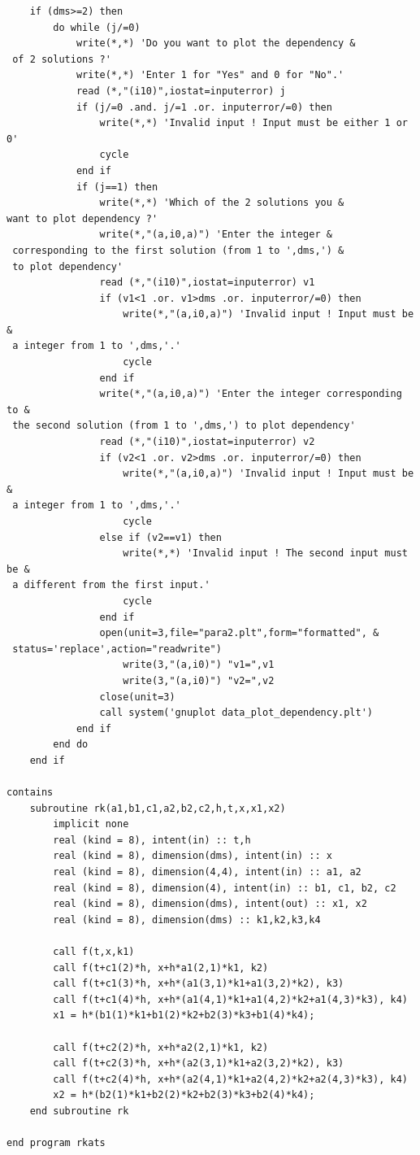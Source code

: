 \documentclass[a4paper,oneside]{book}
\numberwithin{equation}{chapter}
\begin{document}
\begin{lstlisting}
	if (dms>=2) then
		do while (j/=0)
			write(*,*) 'Do you want to plot the dependency &
 of 2 solutions ?'
			write(*,*) 'Enter 1 for "Yes" and 0 for "No".'
			read (*,"(i10)",iostat=inputerror) j
			if (j/=0 .and. j/=1 .or. inputerror/=0) then
				write(*,*) 'Invalid input ! Input must be either 1 or 0'
				cycle
			end if
			if (j==1) then
				write(*,*) 'Which of the 2 solutions you &
want to plot dependency ?'
				write(*,"(a,i0,a)") 'Enter the integer &
 corresponding to the first solution (from 1 to ',dms,') &
 to plot dependency'
				read (*,"(i10)",iostat=inputerror) v1
				if (v1<1 .or. v1>dms .or. inputerror/=0) then
					write(*,"(a,i0,a)") 'Invalid input ! Input must be &
 a integer from 1 to ',dms,'.'
					cycle
				end if
				write(*,"(a,i0,a)") 'Enter the integer corresponding to &
 the second solution (from 1 to ',dms,') to plot dependency'
				read (*,"(i10)",iostat=inputerror) v2
				if (v2<1 .or. v2>dms .or. inputerror/=0) then
					write(*,"(a,i0,a)") 'Invalid input ! Input must be &
 a integer from 1 to ',dms,'.'
					cycle
				else if (v2==v1) then
					write(*,*) 'Invalid input ! The second input must be & 
 a different from the first input.'
					cycle
				end if
				open(unit=3,file="para2.plt",form="formatted", &
 status='replace',action="readwrite")
					write(3,"(a,i0)") "v1=",v1
					write(3,"(a,i0)") "v2=",v2
				close(unit=3)
				call system('gnuplot data_plot_dependency.plt')
			end if
		end do
	end if
	
contains
	subroutine rk(a1,b1,c1,a2,b2,c2,h,t,x,x1,x2)
		implicit none
		real (kind = 8), intent(in) :: t,h
		real (kind = 8), dimension(dms), intent(in) :: x
		real (kind = 8), dimension(4,4), intent(in) :: a1, a2
		real (kind = 8), dimension(4), intent(in) :: b1, c1, b2, c2
		real (kind = 8), dimension(dms), intent(out) :: x1, x2
		real (kind = 8), dimension(dms) :: k1,k2,k3,k4
		
		call f(t,x,k1)
		call f(t+c1(2)*h, x+h*a1(2,1)*k1, k2)
		call f(t+c1(3)*h, x+h*(a1(3,1)*k1+a1(3,2)*k2), k3)
		call f(t+c1(4)*h, x+h*(a1(4,1)*k1+a1(4,2)*k2+a1(4,3)*k3), k4)
		x1 = h*(b1(1)*k1+b1(2)*k2+b2(3)*k3+b1(4)*k4);

		call f(t+c2(2)*h, x+h*a2(2,1)*k1, k2)
		call f(t+c2(3)*h, x+h*(a2(3,1)*k1+a2(3,2)*k2), k3)
		call f(t+c2(4)*h, x+h*(a2(4,1)*k1+a2(4,2)*k2+a2(4,3)*k3), k4)
		x2 = h*(b2(1)*k1+b2(2)*k2+b2(3)*k3+b2(4)*k4);
	end subroutine rk
	
end program rkats
\end{lstlisting}
\end{document}
